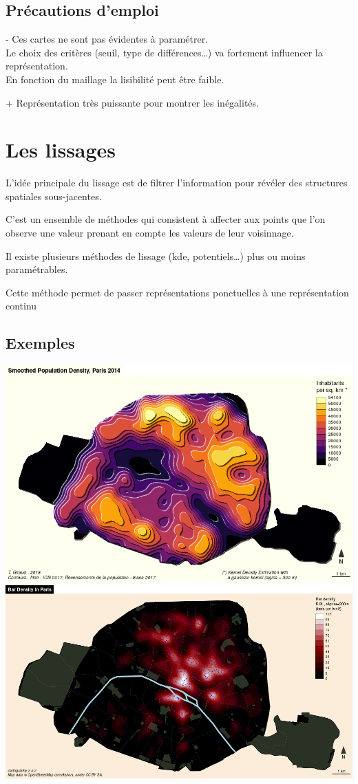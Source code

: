 \documentclass[]{book}
\begin{document}
\subsection{Précautions d'emploi}\label{precautions-demploi-4}

- Ces cartes ne sont pas évidentes à paramétrer.\\
Le choix des critères (seuil, type de différences\ldots{}) va fortement
influencer la représentation.\\
En fonction du maillage la lisibilité peut être faible.

+ Représentation très puissante pour montrer les inégalités.

\section{Les lissages}\label{les-lissages}

L'idée principale du lissage est de filtrer l'information pour révéler
des structures spatiales sous-jacentes.

C'est un ensemble de méthodes qui consistent à affecter aux points que
l'on observe une valeur prenant en compte les valeurs de leur
voisinnage.

Il existe plusieurs méthodes de lissage (kde, potentiels\ldots{}) plus
ou moins paramétrables.

Cette méthode permet de passer représentations ponctuelles à une
représentation continu

\subsection{Exemples}\label{exemples-2}

\includegraphics{img/liss1.png} \includegraphics{img/liss2.png}
\end{document}

